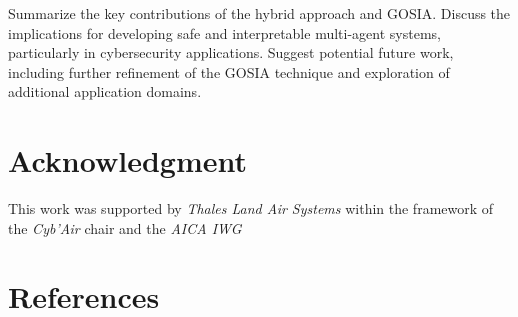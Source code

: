 \documentclass[runningheads]{llncs}
\newcounter{proof}
\begin{document}
Summarize the key contributions of the hybrid approach and GOSIA. Discuss the implications for developing safe and interpretable multi-agent systems, particularly in cybersecurity applications. Suggest potential future work, including further refinement of the GOSIA technique and exploration of additional application domains.

\section*{Acknowledgment}

This work was supported by \emph{Thales Land Air Systems} within the framework of the \emph{Cyb'Air} chair and the \emph{AICA IWG}


\section*{References}

% 






% 
\end{document}
